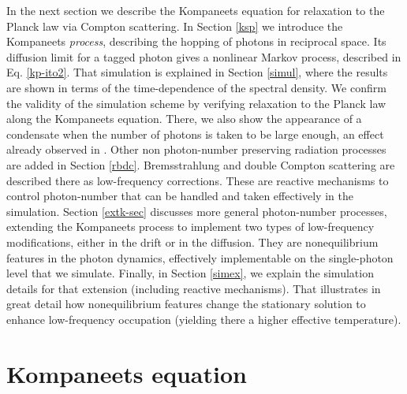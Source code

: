 \documentclass[a4paper,12pt,reqno,superscriptaddress,nofootinbib]{revtex4}
\newcommand{\0}{^{(0)}}
\newcommand{\1}{^{(1)}}
\newcommand{\2}{^{(2)}}
\begin{document}
In the next section we describe the Kompaneets equation for relaxation to the Planck law via Compton scattering.  In Section \ref{ksp} we introduce the Kompaneets {\it process}, describing the hopping of photons in reciprocal space.  Its diffusion limit for a tagged photon gives a nonlinear Markov process, described in Eq. \eqref{kp-ito2}.   That simulation is explained in Section \ref{simul}, where the results are shown in terms of the time-dependence of the spectral density. We confirm the validity of the simulation scheme by verifying relaxation to the Planck law along the Kompaneets equation. There, we also show the appearance of a condensate when the number of photons is taken to be large enough, an effect already observed in \cite{levermore}. Other non photon-number preserving radiation processes are added in Section 
\ref{rbdc}. Bremsstrahlung and double Compton scattering are described there as low-frequency corrections. These are reactive mechanisms to control photon-number that can be handled and taken effectively in the simulation.   Section \ref{extk-sec} discusses more general photon-number processes, extending the Kompaneets process to implement two types of low-frequency modifications, either in the drift or in the diffusion. They are nonequilibrium features in the photon dynamics, effectively implementable on the single-photon level that we simulate. Finally, in Section \ref{simex}, we explain the simulation details for that extension (including reactive mechanisms). That illustrates in great detail how nonequilibrium features change the stationary solution to enhance low-frequency occupation (yielding there a higher effective temperature). 






\section{Kompaneets equation}
\end{document}
